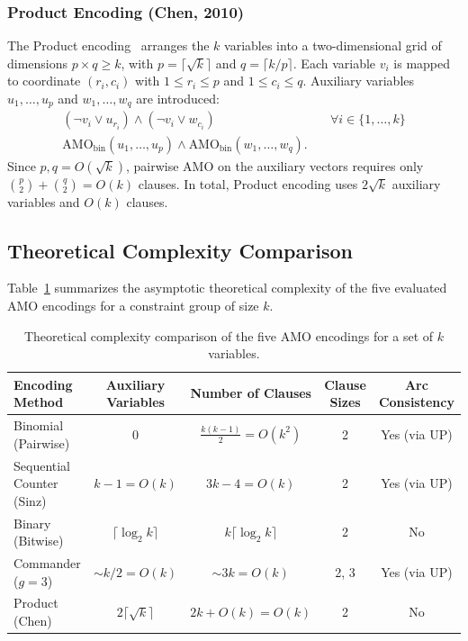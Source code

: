 \documentclass[a4paper,fleqn]{cas-sc}
\begin{document}
\subsubsection{Product Encoding (Chen, 2010)}
The Product encoding~\cite{chen2010new} arranges the $k$ variables into a two-dimensional grid of dimensions $p \times q \ge k$, with $p = \lceil \sqrt{k} \rceil$ and $q = \lceil k / p \rceil$. Each variable $v_i$ is mapped to coordinate $(r_i, c_i)$ with $1 \le r_i \le p$ and $1 \le c_i \le q$. Auxiliary variables $u_1, \ldots, u_p$ and $w_1, \ldots, w_q$ are introduced:
\begin{align}
    (\neg v_i \vee u_{r_i}) \wedge (\neg v_i \vee w_{c_i}) & \quad \forall i \in \{1, \ldots, k\} \label{eq:prod_link} \\
    \text{AMO}_{\text{bin}}(u_1, \ldots, u_p) \wedge \text{AMO}_{\text{bin}}(w_1, \ldots, w_q). & \label{eq:prod_amo}
\end{align}
Since $p, q = O(\sqrt{k})$, pairwise AMO on the auxiliary vectors requires only $\binom{p}{2} + \binom{q}{2} = O(k)$ clauses. In total, Product encoding uses $2\sqrt{k}$ auxiliary variables and $O(k)$ clauses.

\subsection{Theoretical Complexity Comparison}

Table~\ref{tab:encoding_complexity} summarizes the asymptotic theoretical complexity of the five evaluated AMO encodings for a constraint group of size $k$.

\begin{table}[pos=!htb]
\centering\footnotesize
\renewcommand{\arraystretch}{0.82}
\caption{Theoretical complexity comparison of the five AMO encodings for a set of $k$ variables.}
\label{tab:encoding_complexity}
\begin{tabular}{lcccc}
\toprule
\textbf{Encoding Method} & \textbf{Auxiliary Variables} & \textbf{Number of Clauses} & \textbf{Clause Sizes} & \textbf{Arc Consistency} \\
\midrule
Binomial (Pairwise)      & $0$                          & $\frac{k(k-1)}{2} = O(k^2)$& 2                     & Yes (via UP) \\
Sequential Counter (Sinz)& $k - 1 = O(k)$               & $3k - 4 = O(k)$            & 2                     & Yes (via UP) \\
Binary (Bitwise)         & $\lceil \log_2 k \rceil$     & $k \lceil \log_2 k \rceil$ & 2                     & No \\
Commander ($g=3$)        & $\sim k/2 = O(k)$            & $\sim 3k = O(k)$           & 2, 3                  & Yes (via UP) \\
Product (Chen)           & $2\lceil \sqrt{k} \rceil$    & $2k + O(k) = O(k)$         & 2                     & No \\
\bottomrule
\end{tabular}
\end{table}
\end{document}
